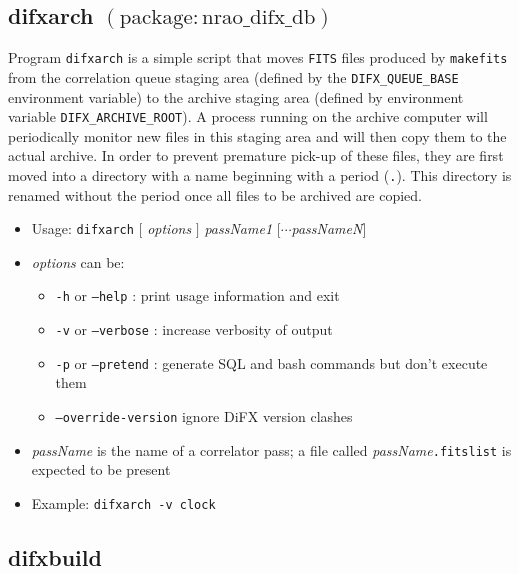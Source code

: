 
\subsection{difxarch {\small $\mathrm{(package: nrao\_difx\_db)}$}} \label{sec:difxarch}

Program {\tt difxarch} is a simple script that moves {\tt FITS} files produced by {\tt makefits} from the correlation queue staging area (defined by the {\tt DIFX\_QUEUE\_BASE} environment variable) to the archive staging area (defined by environment variable {\tt DIFX\_ARCHIVE\_ROOT}).
A process running on the archive computer will periodically monitor new files in this staging area and will then copy them to the actual archive.
In order to prevent premature pick-up of these files, they are first moved into a directory with a name beginning with a period ({\tt .}).
This directory is renamed without the period once all files to be archived are copied.

\begin{itemize}
\item[] Usage: {\tt difxarch} $[$ {\em options} $]$ {\em passName1} $[\cdots${\em passNameN}$]$
\item[] {\em options} can be:
\begin{itemize}
\item[] {\tt -h} or {\tt --help} : print usage information and exit
\item[] {\tt -v} or {\tt --verbose} : increase verbosity of output
\item[] {\tt -p} or {\tt --pretend} : generate SQL and bash commands but don't execute them
\item[] {\tt --override-version} ignore DiFX version clashes 
\end{itemize}
\item[] {\em passName} is the name of a correlator pass; a file called {\em passName}{\tt .fitslist} is expected to be present
\item[] Example: {\tt difxarch -v clock}
\end{itemize}








\subsection{difxbuild} \label{sec:difxbuild}

